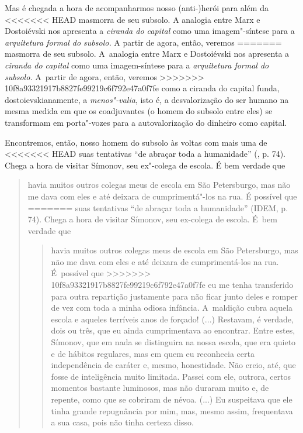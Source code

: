 {Mas é chegada a hora de acompanharmos nosso (anti-)herói para além da
<<<<<<< HEAD
masmorra de seu subsolo. A analogia entre Marx e Dostoiévski nos
apresenta a \emph{ciranda do capital} como uma imagem"-síntese para a
\emph{arquitetura formal do subsolo.} A partir de agora, então, veremos
=======
masmorra de seu subsolo. A~analogia entre Marx e Dostoiévski nos
apresenta a \emph{ciranda do capital} como uma imagem-síntese para a
\emph{arquitetura formal do subsolo.} A~partir de agora, então, veremos
>>>>>>> 10f8a93321917b8827fe99219c6f792e47a0f7fe
como a ciranda do capital funda, dostoievskianamente, a
\emph{menos"-valia}, isto é, a desvalorização do ser humano na mesma
medida em que os coadjuvantes (o homem do subsolo entre eles) se
transformam em porta"-vozes para a autovalorização do dinheiro como
capital.

Encontremos, então, nosso homem do subsolo às voltas com mais uma de
<<<<<<< HEAD
suas tentativas ``de abraçar toda a humanidade'' (, p. 74). Chega a
hora de visitar Símonov, seu ex"-colega de escola. É bem verdade que

\begin{quote}
havia muitos outros colegas meus de escola em São Petersburgo, mas não
me dava com eles e até deixara de cumprimentá"-los na rua. É possível que
=======
suas tentativas ``de abraçar toda a humanidade'' (IDEM, p. 74). Chega a
hora de visitar Símonov, seu ex-colega de escola. É~bem verdade que

\begin{quote}
havia muitos outros colegas meus de escola em São Petersburgo, mas não
me dava com eles e até deixara de cumprimentá-los na rua. É~possível que
>>>>>>> 10f8a93321917b8827fe99219c6f792e47a0f7fe
eu me tenha transferido para outra repartição justamente para não ficar
junto deles e romper de vez com toda a minha odiosa infância. A~maldição
cubra aquela escola e aqueles terríveis anos de forçado! (...) Restavam,
é verdade, dois ou três, que eu ainda cumprimentava ao encontrar. Entre
estes, Símonov, que em nada se distinguira na nossa escola, que era
quieto e de hábitos regulares, mas em quem eu reconhecia certa
independência de caráter e, mesmo, honestidade. Não creio, até, que
fosse de inteligência muito limitada. Passei com ele, outrora, certos
momentos bastante luminosos, mas não duraram muito e, de repente, como
que se cobriram de névoa. (...) Eu suspeitava que ele tinha grande
repugnância por mim, mas, mesmo assim, frequentava a sua casa, pois não
tinha certeza disso.


\end{quote}
\end{quote}}
